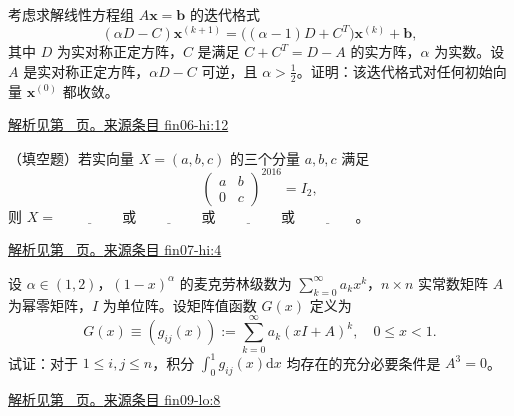 \documentclass[UTF8,12pt,a4paper,fontset=fandol]{ctexart}
\begin{document}
\begin{example}\label{ex:fin06-hi:12}

考虑求解线性方程组 $A\mathbf x=\mathbf b$ 的迭代格式
\[
(\alpha D-C)\mathbf x^{(k+1)}=\bigl((\alpha-1)D+C^{T}\bigr)\mathbf x^{(k)}+\mathbf b,
\]
其中 $D$ 为实对称正定方阵，$C$ 是满足 $C+C^{T}=D-A$ 的实方阵，$\alpha$ 为实数。设 $A$ 是实对称正定方阵，$\alpha D-C$ 可逆，且 $\alpha>\frac12$。证明：该迭代格式对任何初始向量 $\mathbf x^{(0)}$ 都收敛。

\par\hyperref[ans:fin06-hi:12]{解析见第~\pageref{ans:fin06-hi:12} 页。}\quad\href{https://github.com/lzxcr/cmc-mathematics/blob/64916fa1fdbc3e444a652eca204d5669058ee321/src/problems/finals/06/13.md}{来源条目 fin06-hi:12}

\end{example}

\begin{example}\label{ex:fin07-hi:4}

（填空题）若实向量 $X=\left(a,b,c\right)$ 的三个分量 $a,b,c$ 满足
\[
\begin{pmatrix} a & b \\ 0 & c \end{pmatrix}^{2016}=I_{2},
\]
则 $X=$ $\underline{\qquad\qquad}$ 或 $\underline{\qquad\qquad}$ 或 $\underline{\qquad\qquad}$ 或 $\underline{\qquad\qquad}$。

\par\hyperref[ans:fin07-hi:4]{解析见第~\pageref{ans:fin07-hi:4} 页。}\quad\href{https://github.com/lzxcr/cmc-mathematics/blob/64916fa1fdbc3e444a652eca204d5669058ee321/src/problems/finals/07/04.md}{来源条目 fin07-hi:4}

\end{example}

\begin{example}\label{ex:fin09-lo:8}

设 $\alpha \in (1, 2)$，$(1 - x)^{\alpha}$ 的麦克劳林级数为 $\sum_{k=0}^{\infty} a_k x^k$，$n \times n$ 实常数矩阵 $A$ 为幂零矩阵，$I$ 为单位阵。设矩阵值函数 $G(x)$ 定义为
\[
G(x) \equiv \left( g_{ij}(x) \right) := \sum_{k=0}^{\infty} a_k (xI + A)^k, \quad 0 \leq x < 1.
\]
试证：对于 $1 \leq i, j \leq n$，积分 $\int_0^1 g_{ij}(x) \mathrm{d}x$ 均存在的充分必要条件是 $A^3 = 0$。

\par\hyperref[ans:fin09-lo:8]{解析见第~\pageref{ans:fin09-lo:8} 页。}\quad\href{https://github.com/lzxcr/cmc-mathematics/blob/64916fa1fdbc3e444a652eca204d5669058ee321/src/problems/finals/09/08.md}{来源条目 fin09-lo:8}

\end{example}
\end{document}
